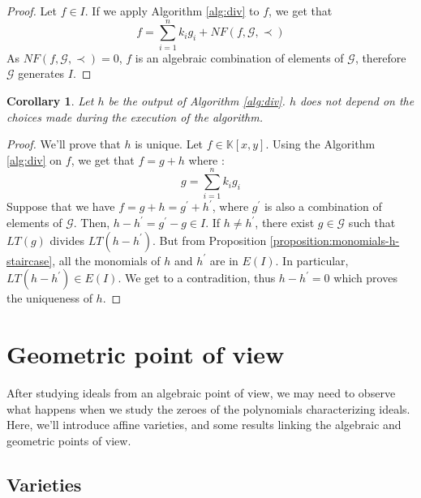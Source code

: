 \documentclass{article}
\newtheorem{corollary}{Corollary}[theorem]
\begin{document}
\begin{proof}
    Let $f \in I$. If we apply Algorithm \ref{alg:div} to $f$, we get that 
    \begin{displaymath}
        f = \sum_{i = 1}^{n} k_{i}g_{i} + NF(f, \mathscr{G}, \prec)
    \end{displaymath}
    As $NF(f, \mathscr{G}, \prec) = 0$, $f$ is an algebraic combination of elements of $\mathscr{G}$, therefore $\mathscr{G}$ generates $I$.
\end{proof}

\begin{corollary}
    Let $h$ be the output of Algorithm \ref{alg:div}. $h$ does not depend on the choices made during the execution of the algorithm.
\end{corollary}

\begin{proof}
    We'll prove that $h$ is unique. Let $f \in \mathbb{K}[x, y]$. Using the Algorithm \ref{alg:div} on $f$, we get that $f = g + h$ where : 
    \begin{displaymath}
        g = \sum_{i = 1}^{n} k_{i}g_{i} 
    \end{displaymath}
    Suppose that we have $f = g + h = g^{\prime} + h^{\prime}$, where $g^{\prime}$ is also a combination of elements of $\mathscr{G}$. Then, $h - h^{\prime} = g^{\prime} - g \in I$. If $h \neq h^{\prime}$, there exist $g \in \mathscr{G}$ such that $LT(g)$ divides $LT(h - h^{\prime})$. But from Proposition \ref{proposition:monomials-h-staircase}, all the monomials of $h$ and $h^{\prime}$ are in $E(I)$. In particular, $LT(h - h^{\prime}) \in E(I)$. We get to a contradition, thus $h - h^{\prime} = 0$ which proves the uniqueness of $h$.
\end{proof}

\section{Geometric point of view}\label{sec:gpov}

\par After studying ideals from an algebraic point of view, we may need to observe what happens when we study the zeroes of the polynomials characterizing ideals. Here, we'll introduce affine varieties, and some results linking the algebraic and geometric points of view.

\subsection*{Varieties}
\end{document}
